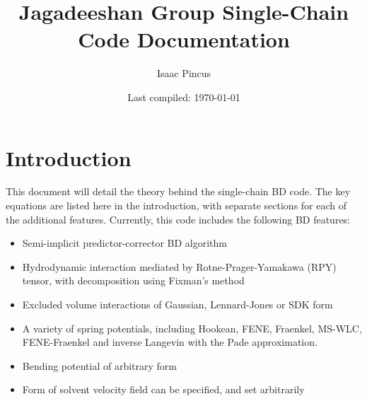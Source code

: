 \documentclass{article}
\title{Jagadeeshan Group Single-Chain Code Documentation}
\author{Isaac Pincus}
\date{Last compiled: \today}
\begin{document}
\maketitle

\tableofcontents

\section{Introduction}
This document will detail the theory behind the single-chain BD code.
The key equations are listed here in the introduction, with separate sections for each of the additional features.
Currently, this code includes the following BD features:

\begin{itemize}
    \item Semi-implicit predictor-corrector BD algorithm
    \item Hydrodynamic interaction mediated by Rotne-Prager-Yamakawa (RPY) tensor, with decomposition using Fixman's method
    \item Excluded volume interactions of Gaussian, Lennard-Jones or SDK form
    \item A variety of spring potentials, including Hookean, FENE, Fraenkel, MS-WLC, FENE-Fraenkel and inverse Langevin with the Pade approximation.
    \item Bending potential of arbitrary form
    \item Form of solvent velocity field can be specified, and set arbitrarily
\end{itemize}
\end{document}

